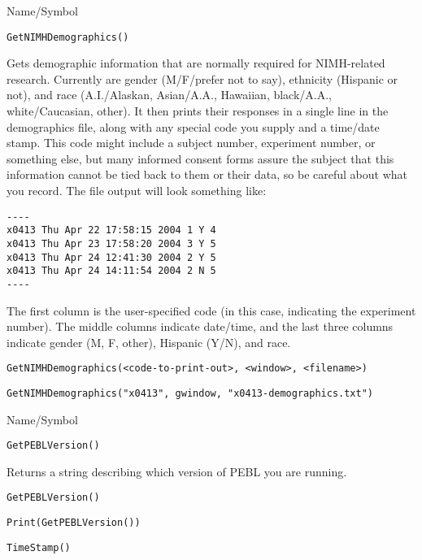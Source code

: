 \begin{desc}{Name/Symbol}
\item[Name/Symbol]	\verb+GetNIMHDemographics()+

\item[Description]	Gets demographic information that are normally required for NIMH-related research.  Currently are gender (M/F/prefer not to say), ethnicity (Hispanic or not), and race (A.I./Alaskan, Asian/A.A., Hawaiian, black/A.A., white/Caucasian, other).  
		It then prints their responses in a single line in the demographics file, along with any special code you supply and a time/date stamp. This code might include a subject number, experiment number, or something else, but many informed consent forms assure the subject that this information cannot be tied back to them or their data, so be careful about what you record. The file output will look something like: 
\begin{verbatim}
---- 
x0413 Thu Apr 22 17:58:15 2004 1 Y 4 
x0413 Thu Apr 23 17:58:20 2004 3 Y 5 
x0413 Thu Apr 24 12:41:30 2004 2 Y 5 
x0413 Thu Apr 24 14:11:54 2004 2 N 5 
---- 
\end{verbatim}


	The first column is the user-specified code (in this 
	case, indicating the experiment number).  The middle columns 
	indicate date/time, and the last three columns indicate 
	gender (M, F, other), Hispanic (Y/N), and race.

\item[Usage]
\begin{verbatim}
GetNIMHDemographics(<code-to-print-out>, <window>, <filename>)
\end{verbatim} 

\item[Example]
\begin{verbatim}
GetNIMHDemographics("x0413", gwindow, "x0413-demographics.txt")
\end{verbatim}

\item[See Also]	
\end{desc}

\rl




\begin{desc}{Name/Symbol}
\item[Name/Symbol]	\verb+GetPEBLVersion()+

\item[Description]	Returns a string describing which version of PEBL you are running.

\item[Usage]
\begin{verbatim}
GetPEBLVersion() 
\end{verbatim}

\item[Example]
\begin{verbatim}
Print(GetPEBLVersion())
\end{verbatim}

\item[See Also]	\verb+TimeStamp()+
\end{desc}

